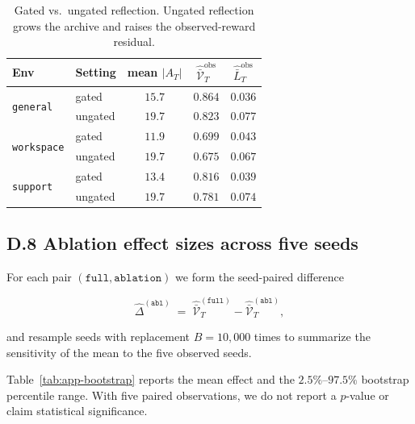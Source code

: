 \documentclass{article} %
\begin{document}
\begin{table}[h]
\centering
\small
\begin{tabular}{llccc}
\toprule
Env & Setting & mean $|A_T|$ & $\widehat{\bar{\mathcal V}}_T^{\mathrm{obs}}$ & $\widehat{\bar L}_T^{\mathrm{obs}}$ \\
\midrule
\multirow{2}{*}{\texttt{general}}
 & gated   & $15.7$ & $0.864$ & $0.036$ \\
 & ungated & $19.7$ & $0.823$ & $0.077$ \\
\midrule
\multirow{2}{*}{\texttt{workspace}}
 & gated   & $11.9$ & $0.699$ & $0.043$ \\
 & ungated & $19.7$ & $0.675$ & $0.067$ \\
\midrule
\multirow{2}{*}{\texttt{support}}
 & gated   & $13.4$ & $0.816$ & $0.039$ \\
 & ungated & $19.7$ & $0.781$ & $0.074$ \\
\bottomrule
\end{tabular}
\caption{Gated vs.\ ungated reflection. Ungated reflection grows the archive
and raises the observed-reward residual.}
\label{tab:app-ungated}
\end{table}

\subsection{D.8 Ablation effect sizes across five seeds}

\label{app:tab-bootstrap}

For each pair $(\texttt{full},\texttt{ablation})$ we form the seed-paired difference

\begin{equation}
\label{eq:app-tab-effect}
\widehat\Delta^{(\texttt{abl})} \;=\; \widehat{\bar{\mathcal V}}_T^{(\texttt{full})} - \widehat{\bar{\mathcal V}}_T^{(\texttt{abl})},
\end{equation}

and resample seeds with replacement \(B=10{,}000\) times to summarize the
sensitivity of the mean to the five observed seeds.

Table~\ref{tab:app-bootstrap} reports the mean effect and the \(2.5\%\)--\(97.5\%\)
bootstrap percentile range. With five paired observations, we do not report a
\(p\)-value or claim statistical significance.
\end{document}

